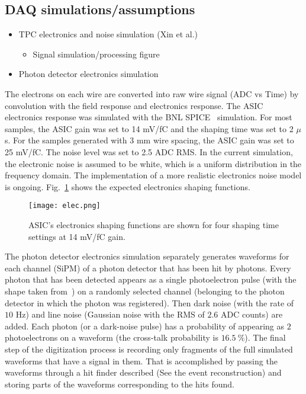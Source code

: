 \subsection{DAQ simulations/assumptions}
\label{sec:tools-mc-daq}

\begin{itemize}
\item TPC electronics and noise simulation (Xin et al.) 
\begin{itemize} \item Signal simulation/processing figure \end{itemize}
\item Photon detector electronics simulation
\end{itemize}

The electrons on each wire are converted into raw wire signal (ADC vs Time) by convolution with the field response and electronics response. The ASIC electronics response was simulated with the BNL SPICE~\cite{spice} simulation.  For most samples, the ASIC gain was set to 14 mV/fC and the shaping time was set to 2 $\mu$s. For the samples generated with 3 mm wire spacing, the ASIC gain was set to 25 mV/fC. The noise level was set to 2.5 ADC RMS. In the current simulation, the electronic noise is assumed to be white, which is a uniform distribution in  the frequency domain. The implementation of a more realistic electronics noise model is ongoing. Fig.~\ref{elec_resp} shows  the expected electronics shaping functions.

\begin{figure}[!h!tbp]
\texttt{[image: elec.png]}
\caption[elec-resp]{ASIC's electronics shaping functions
are shown for four shaping time settings at 14 mV/fC gain.}
\label{elec_resp}
\end{figure}


The photon detector electronics simulation separately generates waveforms 
for each channel (SiPM) of a photon detector that has been hit by photons.
Every photon that has been detected appears as a single photoelectron pulse
(with the shape taken from~\cite{http://lss.fnal.gov/archive/2015/pub/fermilab-pub-15-488-nd-ppd.pdf:2015gov}) on a randomly selected channel
(belonging to the photon detector in which the photon was registered).
Then dark noise (with the rate of $10$ Hz) and 
line noise (Gaussian noise with the RMS of $2.6$ ADC counts) are added.
Each photon (or a dark-noise pulse) has a probability of appearing
as $2$ photoelectrons on a waveform (the cross-talk probability is $16.5~\%$).
The final step of the digitization process is recording only fragments
of the full simulated waveforms that have a signal in them.
That is accomplished by passing the waveforms through a hit finder
described (See the event reconstruction)  
and storing parts of the waveforms corresponding to the hits found.



